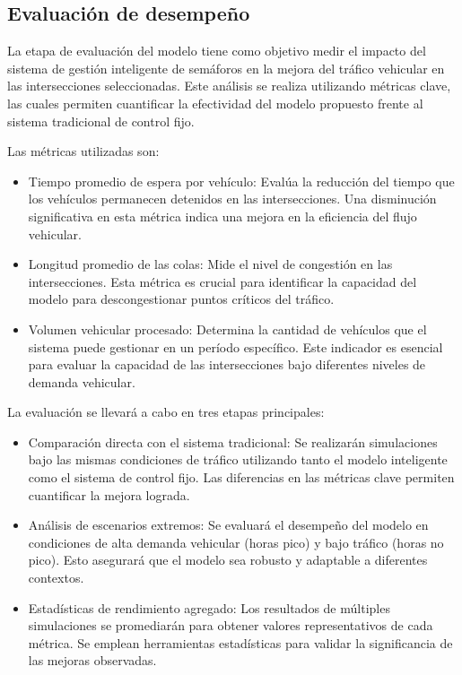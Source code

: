 \subsection{Evaluación de desempeño}

La etapa de evaluación del modelo tiene como objetivo medir el impacto del sistema de gestión inteligente de semáforos en la mejora del tráfico vehicular en las intersecciones seleccionadas. Este análisis se realiza utilizando métricas clave, las cuales permiten cuantificar la efectividad del modelo propuesto frente al sistema tradicional de control fijo.

Las métricas utilizadas son:
\begin{itemize}
    \item Tiempo promedio de espera por vehículo: Evalúa la reducción del tiempo que los vehículos permanecen detenidos en las intersecciones. Una disminución significativa en esta métrica indica una mejora en la eficiencia del flujo vehicular.
    \item Longitud promedio de las colas: Mide el nivel de congestión en las intersecciones. Esta métrica es crucial para identificar la capacidad del modelo para descongestionar puntos críticos del tráfico.
    \item Volumen vehicular procesado: Determina la cantidad de vehículos que el sistema puede gestionar en un período específico. Este indicador es esencial para evaluar la capacidad de las intersecciones bajo diferentes niveles de demanda vehicular.
\end{itemize}

La evaluación se llevará a cabo en tres etapas principales:

\begin{itemize}
    \item Comparación directa con el sistema tradicional: Se realizarán simulaciones bajo las mismas condiciones de tráfico utilizando tanto el modelo inteligente como el sistema de control fijo. Las diferencias en las métricas clave permiten cuantificar la mejora lograda.
    \item Análisis de escenarios extremos: Se evaluará el desempeño del modelo en condiciones de alta demanda vehicular (horas pico) y bajo tráfico (horas no pico). Esto asegurará que el modelo sea robusto y adaptable a diferentes contextos.
    \item Estadísticas de rendimiento agregado: Los resultados de múltiples simulaciones se promediarán para obtener valores representativos de cada métrica. Se emplean herramientas estadísticas para validar la significancia de las mejoras observadas.
\end{itemize}

